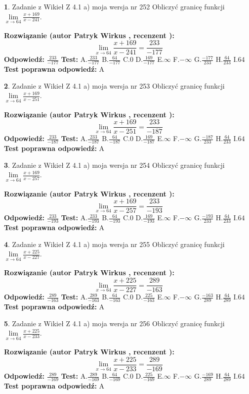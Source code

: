 \documentclass[12pt, a4paper]{article}
\theoremstyle{definition} %
\newtheorem{zad}{}
\newcommand{\zadStart}[1]{\begin{zad}#1\newline}
\newcommand{\zadStop}{\end{zad}}
\newcommand{\rozwStart}[2]{\noindent \textbf{Rozwiązanie (autor #1 , recenzent #2): }\newline}
\newcommand{\rozwStop}{\newline}
\newcommand{\odpStart}{\noindent \textbf{Odpowiedź:}\newline}
\newcommand{\odpStop}{\newline}
\newcommand{\testStart}{\noindent \textbf{Test:}\newline}
\newcommand{\testStop}{\newline}
\newcommand{\kluczStart}{\noindent \textbf{Test poprawna odpowiedź:}\newline}
\newcommand{\kluczStop}{\newline}
\begin{document}
\zadStart{Zadanie z Wikieł Z 4.1 a) moja wersja nr 252}
Obliczyć granicę funkcji $\lim\limits_{x\to64}\frac{x+169}{x-241}$.
\zadStop
\rozwStart{Patryk Wirkus}{}
$$\lim\limits_{x\to64}\frac{x+169}{x-241} = \frac{233}{-177}$$
\rozwStop
\odpStart
$\frac{233}{-177}$
\odpStop
\testStart
A.$\frac{233}{-177}$
B.$\frac{64}{-177}$
C.$0$
D.$\frac{169}{-177}$
E.$\infty$
F.$-\infty$
G.$\frac{-177}{233}$
H.$\frac{64}{233}$
I.$64$
\testStop
\kluczStart
A
\kluczStop



\zadStart{Zadanie z Wikieł Z 4.1 a) moja wersja nr 253}
Obliczyć granicę funkcji $\lim\limits_{x\to64}\frac{x+169}{x-251}$.
\zadStop
\rozwStart{Patryk Wirkus}{}
$$\lim\limits_{x\to64}\frac{x+169}{x-251} = \frac{233}{-187}$$
\rozwStop
\odpStart
$\frac{233}{-187}$
\odpStop
\testStart
A.$\frac{233}{-187}$
B.$\frac{64}{-187}$
C.$0$
D.$\frac{169}{-187}$
E.$\infty$
F.$-\infty$
G.$\frac{-187}{233}$
H.$\frac{64}{233}$
I.$64$
\testStop
\kluczStart
A
\kluczStop



\zadStart{Zadanie z Wikieł Z 4.1 a) moja wersja nr 254}
Obliczyć granicę funkcji $\lim\limits_{x\to64}\frac{x+169}{x-257}$.
\zadStop
\rozwStart{Patryk Wirkus}{}
$$\lim\limits_{x\to64}\frac{x+169}{x-257} = \frac{233}{-193}$$
\rozwStop
\odpStart
$\frac{233}{-193}$
\odpStop
\testStart
A.$\frac{233}{-193}$
B.$\frac{64}{-193}$
C.$0$
D.$\frac{169}{-193}$
E.$\infty$
F.$-\infty$
G.$\frac{-193}{233}$
H.$\frac{64}{233}$
I.$64$
\testStop
\kluczStart
A
\kluczStop



\zadStart{Zadanie z Wikieł Z 4.1 a) moja wersja nr 255}
Obliczyć granicę funkcji $\lim\limits_{x\to64}\frac{x+225}{x-227}$.
\zadStop
\rozwStart{Patryk Wirkus}{}
$$\lim\limits_{x\to64}\frac{x+225}{x-227} = \frac{289}{-163}$$
\rozwStop
\odpStart
$\frac{289}{-163}$
\odpStop
\testStart
A.$\frac{289}{-163}$
B.$\frac{64}{-163}$
C.$0$
D.$\frac{225}{-163}$
E.$\infty$
F.$-\infty$
G.$\frac{-163}{289}$
H.$\frac{64}{289}$
I.$64$
\testStop
\kluczStart
A
\kluczStop



\zadStart{Zadanie z Wikieł Z 4.1 a) moja wersja nr 256}
Obliczyć granicę funkcji $\lim\limits_{x\to64}\frac{x+225}{x-233}$.
\zadStop
\rozwStart{Patryk Wirkus}{}
$$\lim\limits_{x\to64}\frac{x+225}{x-233} = \frac{289}{-169}$$
\rozwStop
\odpStart
$\frac{289}{-169}$
\odpStop
\testStart
A.$\frac{289}{-169}$
B.$\frac{64}{-169}$
C.$0$
D.$\frac{225}{-169}$
E.$\infty$
F.$-\infty$
G.$\frac{-169}{289}$
H.$\frac{64}{289}$
I.$64$
\testStop
\kluczStart
A
\kluczStop
\end{document}
